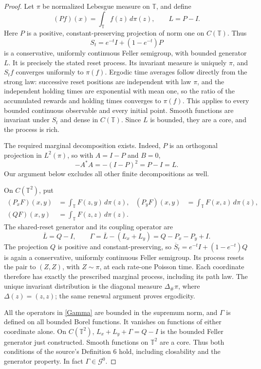 \documentclass[10pt]{article}
\newcommand{\T}{\mathbb T}
\newcommand{\G}{\mathcal G}
\begin{document}
\begin{proof}
Let \(\pi\) be normalized Lebesgue measure on \(\T\), and define
\[
 (Pf)(x)=\int_\T f(z)\,d\pi(z),\qquad L=P-I.
\]
Here \(P\) is a positive, constant-preserving projection of norm one on
\(C(\T)\). Thus
\begin{equation}\label{semigroup}
 S_t=e^{-t}I+(1-e^{-t})P
\end{equation}
is a conservative, uniformly continuous Feller semigroup, with bounded
generator \(L\). It is precisely the stated reset process.
Its invariant measure is uniquely \(\pi\), and \(S_tf\) converges uniformly
to \(\pi(f)\). Ergodic time averages follow directly from the strong law:
successive reset positions are independent with law \(\pi\), and the
independent holding times are exponential with mean one, so the ratio of
the accumulated rewards and holding times converges to \(\pi(f)\).
This applies to every bounded continuous observable and every initial
point. Smooth functions are invariant under \(S_t\) and dense in \(C(\T)\).
Since \(L\) is bounded, they are a core, and the process is rich.

The required marginal decomposition exists. Indeed, \(P\) is an
orthogonal projection in \(L^2(\pi)\), so with \(A=I-P\) and \(B=0\),
\[
 -A^*A=-(I-P)^2=P-I=L.
\]
Our argument below excludes all other finite decompositions as well.

On \(C(\T^2)\), put
\begin{align*}
 (P_xF)(x,y)&=\int_\T F(z,y)\,d\pi(z),&
 (P_yF)(x,y)&=\int_\T F(x,z)\,d\pi(z),\\
 (QF)(x,y)&=\int_\T F(z,z)\,d\pi(z).
\end{align*}
The shared-reset generator and its coupling operator are
\begin{equation}\label{Gamma}
 \overline L=Q-I,\qquad
 \Gamma=\overline L-(L_x+L_y)=Q-P_x-P_y+I.
\end{equation}
The projection \(Q\) is positive and constant-preserving, so
\(\overline S_t=e^{-t}I+(1-e^{-t})Q\) is again a conservative,
uniformly continuous Feller semigroup. Its process resets the pair to
\((Z,Z)\), with \(Z\sim\pi\), at each rate-one Poisson time.
Each coordinate therefore has exactly the prescribed marginal process,
including its path law. The unique invariant distribution is the
diagonal measure \(\Delta_\#\pi\), where \(\Delta(z)=(z,z)\);
the same renewal argument proves ergodicity.

All the operators in \eqref{Gamma} are bounded in the supremum norm,
and \(\Gamma\) is defined on all bounded Borel functions.
It vanishes on functions of either coordinate alone.
On \(C(\T^2)\), \(L_x+L_y+\Gamma=Q-I\) is the bounded Feller generator
just constructed. Smooth functions on \(\T^2\) are a core.
Thus both conditions of the source's Definition 6 hold, including
closability and the generator property. In fact \(\Gamma\in\G^0\).


\end{proof}
\end{document}
